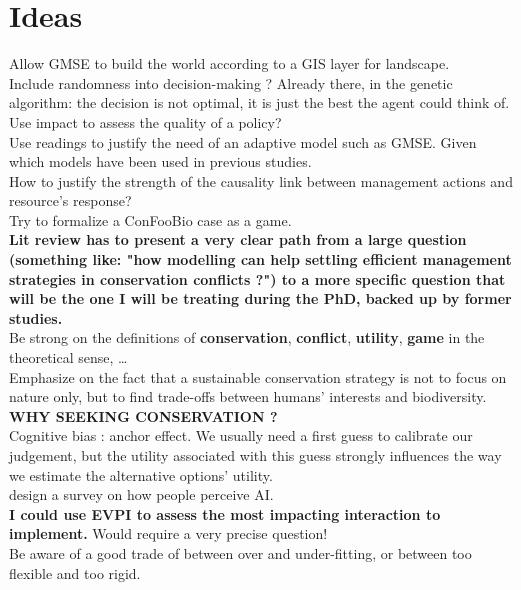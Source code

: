 \documentclass[12pt]{article}
\begin{document}
\section*{Ideas}
Allow GMSE to build the world according to a GIS layer for landscape.\\
Include randomness into decision-making ? Already there, in the genetic algorithm: the decision is not optimal, it is just the best the agent could think of.\\
Use impact to assess the quality of a policy?\\
Use readings to justify the need of an adaptive model such as GMSE. Given which models have been used in previous studies.\\
How to justify the strength of the causality link between management actions and resource's response?\\
Try to formalize a ConFooBio case as a game.\\
\textbf{Lit review has to present a very clear path from a large question (something like: "how modelling can help settling efficient management strategies in conservation conflicts ?") to a more specific question that will be the one I will be treating during the PhD, backed up by former studies.}\\
Be strong on the definitions of \textbf{conservation}, \textbf{conflict}, \textbf{utility}, \textbf{game} in the theoretical sense, \dots\\
Emphasize on the fact that a sustainable conservation strategy is not to focus on nature only, but to find trade-offs between humans' interests and biodiversity.\\
\textbf{WHY SEEKING CONSERVATION ?}\\
Cognitive bias : anchor effect. We usually need a first guess to calibrate our judgement, but the utility associated with this guess strongly influences the way we estimate the alternative options' utility.\\
design a survey on how people perceive AI.\\
\textbf{I could use EVPI to assess the most impacting interaction to implement.} Would require a very precise question!\\
Be aware of a good trade of between over and under-fitting, or between too flexible and too rigid.
\end{document}

